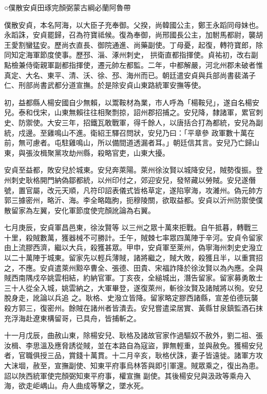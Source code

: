 
\begin{pinyinscope}

 ○僕散安貞田琢完顏弼蒙古綱必蘭阿魯帶



 僕散安貞，本名阿海，以大臣子充奉御。父揆，尚韓國公主，鄭王永蹈同母妹也。永蹈誅，安貞罷歸，召為符寶祗候。復為奉御，尚邢國長公主，加駙馬都尉，襲胡王愛割蠻猛安。歷尚衣直長、御院通進、尚藥副使。丁母憂，起復，轉符寶郎，除同知定海軍節度使事。歷邳、淄、涿州刺史，
 拱衛直都指揮使。貞祐初，改右副點檢兼侍衛親軍副都指揮使，遷元帥左都監。二年，中都解嚴，河北州郡未破者惟真定、大名、東平、清、沃、徐、邳、海州而已。朝廷遣安貞與兵部尚書裴滿子仁、刑部尚書武都分道宣撫。於是除安貞山東路統軍安撫等使。



 初，益都縣人楊安國自少無賴，以鬻鞍材為業，市人呼為「楊鞍兒」，遂自名楊安兒。泰和伐宋，山東無賴往往相聚剽掠，詔州郡招捕之。安兒降，隸諸軍，累官刺史、防禦使。大安三年，招鐵瓦敢戰軍，得千餘人，以唐括合打為都統，安兒為副統，戍邊。至雞鳴山不進。衛紹王驛召問狀，安兒乃曰：「平章參
 政軍數十萬在前，無可慮者。屯駐雞鳴山，所以備間道透漏者耳。」朝廷信其言。安兒乃亡歸山東，與張汝楫聚黨攻劫州縣，殺略官吏，山東大擾。



 安貞至益都，敗安兒於城東。安兒奔萊陽。萊州徐汝賢以城降安兒，賊勢復振。登州刺史耿格開門納偽鄒都統，以州印付之，郊迎安兒，發帑藏以勞賊。安兒遂僭號，置官屬，改元天順，凡符印詔表儀式皆格草定，遂陷寧海，攻濰州。偽元帥方郭三據密州，略沂、海。李全略臨朐，扼穆陵關，欲取益都。安貞以沂州防禦使僕散留家為左翼，安化軍節度使完顏訛論為右翼。



 七月庚辰，安貞軍昌邑東，徐汝賢等
 以三州之眾十萬來拒戰。自午抵暮，轉戰三十里，殺賊數萬，獲器械不可勝計。壬午，賊棘七率眾四萬陣于辛河。安貞令留家由上流膠西濟，繼以大兵，殺獲甚眾。甲申，安貞軍至萊州，偽寧海州刺史史潑立以二十萬陣于城東。留家先以輕兵薄賊，諸將繼之，賊大敗，殺獲且半，以重賞招之，不應。安貞遣萊州黥卒曹全、張德、田貴、宋福詐降於徐汝賢以為內應。全與賊西南隅戍卒姚雲相結，約納官軍。丁亥夜，全縋城出，潛告留家。留家募勇敢士三十人從全入城，姚雲納之，大軍畢登，遂復萊州，斬徐汝賢及諸賊將以徇。安兒脫身走，訛論以兵追
 之。耿格、史潑立皆降。留家略定膠西諸縣，宣差伯德玩襲殺方郭三，復密州。餘賊在諸州者皆潰去。安兒嘗遣梁居實、黃縣甘泉鎮監酒石抹充浮海赴遼東構留哥，已具舟，皆捕斬之。



 十一月戊辰，曲赦山東，除楊安兒、耿格及諸故官家作過驅奴不赦外，劉二祖、張汝楫、李思溫及應脅誘從賊，並在本路自為寇盜，罪無輕重，並與赦免。獲楊安兒者，官職俱授三品，賞錢十萬貫。十二月辛亥，耿格伏誅，妻子皆遠徙。諸軍方攻大沫堌，赦至，宣撫副使、知東平府事烏林答與即引軍還。賊眾乘之，復出為患。詔以陜西統軍使完顏弼知東平府事，權宣撫
 副使。其後楊安兒與汲政等乘舟入海，欲走岠嵎山。舟人曲成等擊之，墜水死。




\end{pinyinscope}
